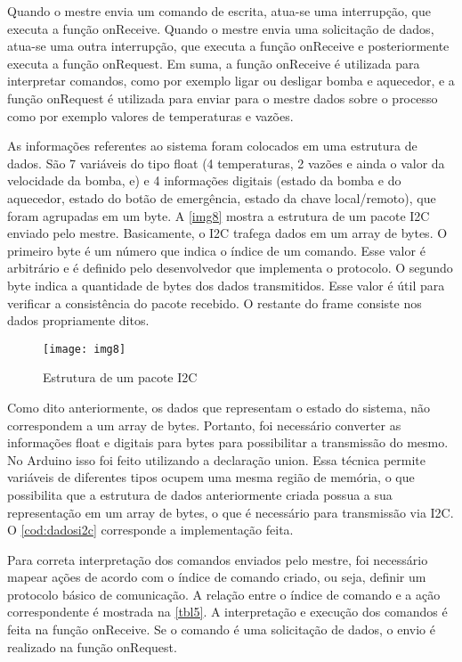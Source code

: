 			Quando o mestre envia um comando de escrita, atua-se uma interrupção, que executa a função onReceive. Quando o mestre envia uma solicitação de dados, atua-se uma outra interrupção, que executa a função onReceive e posteriormente executa a função onRequest. Em suma, a função onReceive é utilizada para interpretar comandos, como por exemplo ligar ou desligar bomba e aquecedor, e a função onRequest é utilizada para enviar para o mestre dados sobre o processo como por exemplo valores de temperaturas e vazões.
			
			As informações referentes ao sistema foram colocados em uma estrutura de dados. São 7 variáveis do tipo float (4 temperaturas, 2 vazões e ainda o valor da velocidade da bomba, e) e 4 informações digitais (estado da bomba e do aquecedor, estado do botão de emergência, estado da chave local/remoto), que foram agrupadas em um byte. A \autoref{img8} mostra a estrutura de um pacote I2C enviado pelo mestre. Basicamente, o I2C trafega dados em um array de bytes. O primeiro byte é um número que indica o índice de um comando. Esse valor é arbitrário e é definido pelo desenvolvedor que implementa o protocolo. O segundo byte indica a quantidade de bytes dos dados transmitidos. Esse valor é útil para verificar a consistência do pacote recebido. O restante do frame consiste nos dados propriamente ditos.
			
			\begin{figure}[!htb]	
				\captionsetup{justification=centering}
				\begin{center}
					\texttt{[image: img8]}  %
					\caption[Estrutura de um pacote I2C]{\label{img8}Estrutura de um pacote I2C}
				\end{center}		
			\end{figure}
			
			Como dito anteriormente, os dados que representam o estado do sistema, não correspondem a um array de bytes. Portanto, foi necessário converter as informações float e digitais para bytes para possibilitar a transmissão do mesmo. No Arduino isso foi feito utilizando a declaração union. Essa técnica permite variáveis de diferentes tipos ocupem uma mesma região de memória, o que possibilita que a estrutura de dados anteriormente criada possua a sua representação em um array de bytes, o que é necessário para transmissão via I2C. O \autoref{cod:dadosi2c} corresponde a implementação feita.
			
			Para correta interpretação dos comandos enviados pelo mestre, foi necessário mapear ações de acordo com o índice de comando criado, ou seja, definir um protocolo básico de comunicação.
			A relação entre o índice de comando e a ação correspondente é mostrada na \autoref{tbl5}. A interpretação e execução dos comandos é feita na função onReceive. Se o comando é uma solicitação de dados, o envio é realizado na função onRequest.
						
